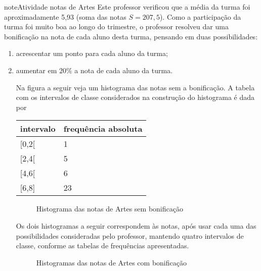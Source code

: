 \begin{sphinxadmonition}{note}{Atividade}{ notas de Artes}
Este professor verificou que a média da turma foi aproximadamente 5,93 (soma das notas \(S=207,5\)). Como a participação da turma foi muito boa ao longo do trimestre, o professor resolveu dar uma bonificação na nota de cada aluno desta turma, pensando em duas possibilidades:
\begin{enumerate}
\item {} 
acrescentar um ponto para cada aluno da turma;

\item {} 
aumentar em $20\%$ a nota de cada aluno da turma.



Na figura a seguir veja um histograma das notas sem a bonificação.  A tabela com os intervalos de classe considerados na construção do histograma é dada por


\begin{savenotes}\sphinxattablestart
\centering
{}
\label{\detokenize{PE104-0:id6}}
\sphinxaftercaption
\begin{tabulary}{\linewidth}[t]{|T|T|}
\hline

intervalo
&
frequência absoluta
\\
\hline
{[}0,2{[}
&
1
\\
\hline
{[}2,4{[}
&
5
\\
\hline
{[}4,6{[}
&
6
\\
\hline
{[}6,8{]}
&
23
\\
\hline
\end{tabulary}
\par
\sphinxattableend\end{savenotes}

\begin{figure}[H]
\centering
\capstart

\noindent{}
\caption{Histograma das notas de Artes sem bonificação}\label{\detokenize{PE104-0:fig-histograma-notas-sem-bonificacao}}\label{\detokenize{PE104-0:id7}}\end{figure}

Os dois histogramas a seguir correspondem às notas, após usar cada uma das possibilidades consideradas pelo professor, mantendo quatro intervalos de classe, conforme as tabelas de frequências apresentadas.

\begin{figure}[H]
\centering
\capstart

\noindent{}
\caption{Histogramas das notas de Artes com bonificação}\label{\detokenize{PE104-0:fig-histogramas-notas-aleteradas}}\label{\detokenize{PE104-0:id8}}\end{figure}


\end{enumerate}
\end{sphinxadmonition}

